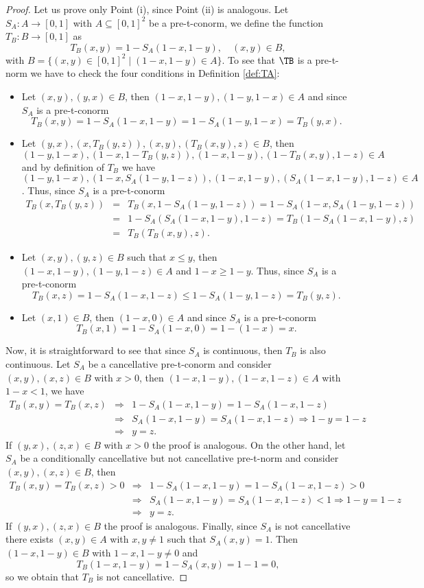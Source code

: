\begin{proof} Let us prove only Point (i), since Point (ii) is analogous. Let $S_A : A \to [0,1]$ with $A \subseteq [0,1]^2$ be a pre-t-conorm, we define  the function $T_B:B \to [0,1]$ as
$$T_B(x,y)=1-S_A(1-x,1-y), \quad (x,y) \in B,$$
with $B=\{(x,y) \in [0,1]^2 \mid (1-x,1-y) \in A\}$. To see that $\TB$ is a pre-t-norm we have to check the four conditions in Definition \ref{def:TA}: \enlargethispage{20pt}
\begin{itemize}
	\item Let $(x,y),(y,x) \in B$, then $(1-x,1-y), (1-y,1-x) \in A$ and since $S_A$ is a pre-t-conorm
	$$T_B(x,y)=1-S_A(1-x,1-y)=1-S_A(1-y,1-x)=T_B(y,x).$$
	\item Let $(y,x),(x,T_B(y,z)),(x,y),(T_B(x,y),z) \in B$, then $(1-y,1-x),(1-x,1-T_B(y,z)),(1-x,1-y),(1-T_B(x,y),1-z) \in A$ and by definition of $T_B$ we have $(1-y,1-x),(1-x,S_A(1-y,1-z)),(1-x,1-y),(S_A(1-x,1-y),1-z) \in A$. Thus,  since $S_A$ is a pre-t-conorm
	\begin{eqnarray*}
	T_B(x,T_B(y,z)) & = & T_B(x,1-S_A(1-y,1-z)) = 1-S_A(1-x,S_A(1-y,1-z)) \\
	& = & 1-S_A(S_A(1-x,1-y),1-z)=T_B(1-S_A(1-x,1-y),z) \\
	& = & T_B(T_B(x,y),z).
	\end{eqnarray*}
	\item Let $(x,y),(y,z) \in B$ such that $x \leq y$, then $(1-x,1-y),(1-y,1-z) \in A$ and $1-x \geq 1-y$. Thus, since $S_A$ is a pre-t-conorm 
	$$T_B(x,z)=1-S_A(1-x,1-z) \leq 1-S_A(1-y,1-z)=T_B(y,z).$$
	\item Let $(x,1) \in B$, then $(1-x,0) \in A$ and since $S_A$ is a pre-t-conorm
	$$T_B(x,1)=1-S_A(1-x,0)=1-(1-x)=x.$$
\end{itemize}
Now, it is straightforward to see that since $S_A$ is continuous, then $T_B$ is also continuous. Let $S_A$ be a cancellative pre-t-conorm and consider $(x,y),(x,z) \in B$ with $x>0$, then $(1-x,1-y),(1-x,1-z) \in A$ with $1-x<1$, we have
\begin{eqnarray*}
T_B(x,y) = T_B(x,z) &\Rightarrow& 1-S_A(1-x,1-y)=1-S_A(1-x,1-z)\\
 &\Rightarrow& S_A(1-x,1-y)=S_A(1-x,1-z) 
\Rightarrow 1-y=1-z \\
& \Rightarrow & y=z.
\end{eqnarray*}
If $(y,x),(z,x) \in B$ with $x>0$ the proof is analogous. On the other hand, let $S_A$ be a conditionally cancellative but not cancellative pre-t-norm and consider $(x,y),(x,z) \in B$, then
\begin{eqnarray*}
	T_B(x,y) = T_B(x,z)>0 &\Rightarrow& 1-S_A(1-x,1-y)=1-S_A(1-x,1-z)>0\\
	&\Rightarrow& S_A(1-x,1-y)=S_A(1-x,1-z)<1
	\Rightarrow 1-y=1-z \\
	&\Rightarrow& y=z.
\end{eqnarray*}
If $(y,x),(z,x) \in B$ the proof is analogous. Finally, since $S_A$ is not cancellative there exists $(x,y) \in A$ with $x,y \not = 1$ such that $S_A(x,y)=1$. Then $(1-x,1-y) \in B$ with $1-x,1-y \not = 0$ and
$$T_B(1-x,1-y)=1-S_A(x,y)=1-1=0,$$
so we obtain that $T_B$ is not cancellative.
\end{proof}

